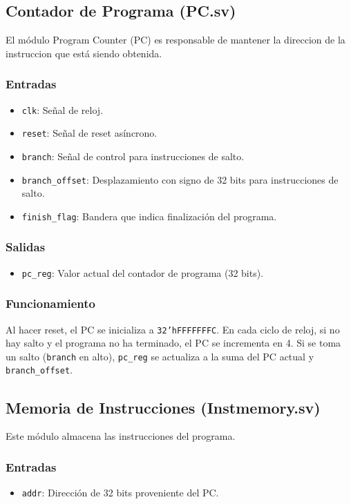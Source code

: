 \documentclass[conference]{IEEEtran}
\begin{document}
\subsection{Contador de Programa (PC.sv)}
El módulo Program Counter (PC) es responsable de mantener la direccion de la instruccion que está siendo obtenida.
\subsubsection{Entradas}
\begin{itemize}
    \item \texttt{clk}: Señal de reloj.
    \item \texttt{reset}: Señal de reset asíncrono.
    \item \texttt{branch}: Señal de control para instrucciones de salto.
    \item \texttt{branch\_offset}: Desplazamiento con signo de 32 bits para instrucciones de salto.
    \item \texttt{finish\_flag}: Bandera que indica finalización del programa.
\end{itemize}
\subsubsection{Salidas}
\begin{itemize}
    \item \texttt{pc\_reg}: Valor actual del contador de programa (32 bits).
\end{itemize}
\subsubsection{Funcionamiento}
Al hacer reset, el PC se inicializa a \texttt{32'hFFFFFFFC}. En cada ciclo de reloj, si no hay salto y el programa no ha terminado, el PC se incrementa en 4. Si se toma un salto (\texttt{branch} en alto), \texttt{pc\_reg} se actualiza a la suma del PC actual y \texttt{branch\_offset}.

\subsection{Memoria de Instrucciones (Instmemory.sv)}
Este módulo almacena las instrucciones del programa.
\subsubsection{Entradas}
\begin{itemize}
    \item \texttt{addr}: Dirección de 32 bits proveniente del PC.
\end{itemize}
\end{document}
